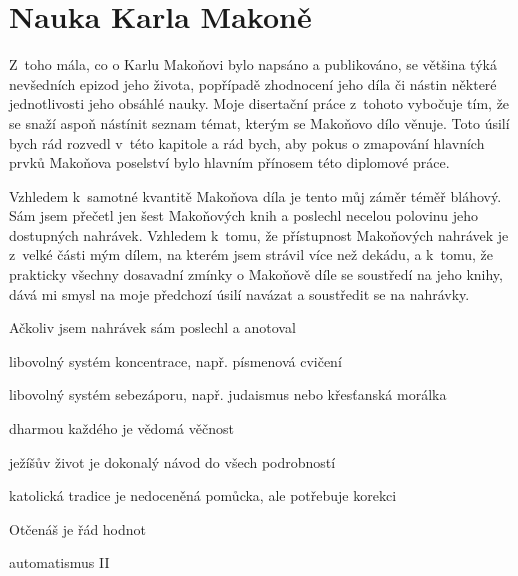 \chapter{Nauka Karla Makoně}

Z~toho mála, co o Karlu Makoňovi bylo napsáno a publikováno, se většina týká
nevšedních epizod jeho života, popřípadě zhodnocení jeho díla či nástin některé
jednotlivosti jeho obsáhlé nauky. Moje disertační práce z~tohoto vybočuje tím,
že se snaží aspoň nástínit seznam témat, kterým se Makoňovo dílo věnuje. Toto
úsilí bych rád rozvedl v~této kapitole a rád bych, aby pokus o zmapování
hlavních prvků Makoňova poselství bylo hlavním přínosem této diplomové práce.

Vzhledem k~samotné kvantitě Makoňova díla je tento můj záměr téměř bláhový. Sám
jsem přečetl jen šest Makoňových knih a poslechl necelou polovinu jeho
dostupných nahrávek. Vzhledem k~tomu, že přístupnost Makoňových nahrávek je
z~velké části mým dílem, na kterém jsem strávil více než dekádu, a k~tomu, že
prakticky všechny dosavadní zmínky o Makoňově díle se soustředí na jeho knihy,
dává mi smysl na moje předchozí úsilí navázat a soustředit se na nahrávky.

Ačkoliv jsem nahrávek sám poslechl a anotoval 

libovolný systém koncentrace, např. písmenová cvičení

libovolný systém sebezáporu, např. judaismus nebo křesťanská morálka

dharmou každého je vědomá věčnost

ježíšův život je dokonalý návod do všech podrobností

katolická tradice je nedoceněná pomůcka, ale potřebuje korekci

Otčenáš je řád hodnot

automatismus II
